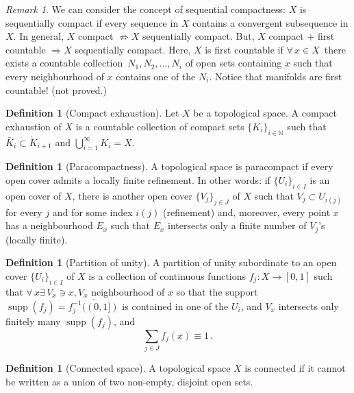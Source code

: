 \documentclass[a4paper,11pt,titlepage, article, oneside]{memoir}
\numberwithin{equation}{section}
\theoremstyle{definition}
\newtheorem{definition}[theorem]{Definition}
\theoremstyle{remark}
\newtheorem{remark}[theorem]{Remark}
\DeclareMathOperator{\supp}{supp}
\begin{document}
\begin{remarkbox}
\begin{remark}
We can consider the concept of sequential compactness: $X$ is sequentially compact if every sequence in $X$ contains a convergent subsequence in $X$. In general, $X$ compact $\not \Rightarrow X$ sequentially compact. But, $X$ compact $+$ first countable $\Rightarrow X$ sequentially compact. Here, $X$ is first countable if $\forall\, x \in X\,$ there exists a countable collection $ \,  N_1, N_2, \ldots, N_i$ of open sets containing $x$ such that every neighbourhood of $x$ contains one of the $N_i$. Notice that manifolds are first countable! (not proved.)
\end{remark}
\end{remarkbox}

\begin{definition}[Compact exhaustion]
Let $X$ be a topological space. A compact exhaustion of $X$ is a countable collection of compact sets $\{K_i\}_{i \in \mathbb{N}}$ such that $\bar K_i \subset \mathring K_{i+1}$ and $\bigcup_{i=1}^{\infty} K_i = X$.
\end{definition}

\begin{definition}[Paracompactness] \label{paracompactness}
A topological space is paracompact if  every open cover admits a locally finite refinement. In other words: if $\{U_i\}_{i \in I}$ is an open cover of $X$, there is another open cover $\{V_j\}_{j \in J}$ of $X$ such that $V_j \subset U_{i(j)}$ for every $j$ and for some index $i(j)$ (refinement) and, moreover, every point $x$ has a neighbourhood $E_x$ such that $E_x$ intersects only a finite number of $V_j$'s (locally finite).
\end{definition}

\begin{definition}[Partition of unity]
A partition of unity subordinate to an open cover $\{U_i\}_{i \in I}$ of $X$ is a collection of continuous functions $f_j \colon X \rightarrow [0, 1]$ such that $\forall \, x \exists \, V_x \ni x, V_x$ neighbourhood of $x$ so that the support $\supp(f_j) = \overline{f_j^{-1}((0, 1])}$ is contained in one of the $U_i$, and $V_x$ intersects only finitely many $\supp(f_j)$, and
$$\sum\limits_{j \in J}f_j(x) \equiv 1 \, .$$
\end{definition}

\begin{definition}[Connected space]\label{connspace}
A topological space $X$ is connected if it cannot be written as a union of two non-empty, disjoint open sets.
\end{definition}
\end{document}
